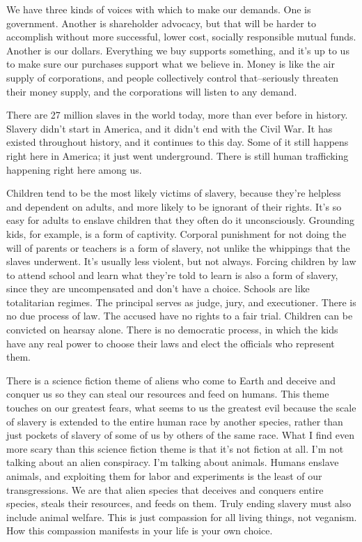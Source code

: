 We have three kinds of voices with which to make our demands. One is government. Another is shareholder advocacy, but that will be harder to accomplish without more successful, lower cost, socially responsible mutual funds. Another is our dollars. Everything we buy supports something, and it's up to us to make sure our purchases support what we believe in. Money is like the air supply of corporations, and people collectively control that–seriously threaten their money supply, and the corporations will listen to any demand.

There are 27 million slaves in the world today, more than ever before in history. Slavery didn't start in America, and it didn't end with the Civil War. It has existed throughout history, and it continues to this day. Some of it still happens right here in America; it just went underground. There is still human trafficking happening right here among us.

Children tend to be the most likely victims of slavery, because they're helpless and dependent on adults, and more likely to be ignorant of their rights. It's so easy for adults to enslave children that they often do it unconsciously. Grounding kids, for example, is a form of captivity. Corporal punishment for not doing the will of parents or teachers is a form of slavery, not unlike the whippings that the slaves underwent. It's usually less violent, but not always. Forcing children by law to attend school and learn what they're told to learn is also a form of slavery, since they are uncompensated and don't have a choice. Schools are like totalitarian regimes. The principal serves as judge, jury, and executioner. There is no due process of law. The accused have no rights to a fair trial. Children can be convicted on hearsay alone. There is no democratic process, in which the kids have any real power to choose their laws and elect the officials who represent them.

There is a science fiction theme of aliens who come to Earth and deceive and conquer us so they can steal our resources and feed on humans. This theme touches on our greatest fears, what seems to us the greatest evil because the scale of slavery is extended to the entire human race by another species, rather than just pockets of slavery of some of us by others of the same race. What I find even more scary than this science fiction theme is that it's not fiction at all. I'm not talking about an alien conspiracy. I'm talking about animals. Humans enslave animals, and exploiting them for labor and experiments is the least of our transgressions. We are that alien species that deceives and conquers entire species, steals their resources, and feeds on them. Truly ending slavery must also include animal welfare. This is just compassion for all living things, not veganism. How this compassion manifests in your life is your own choice.

